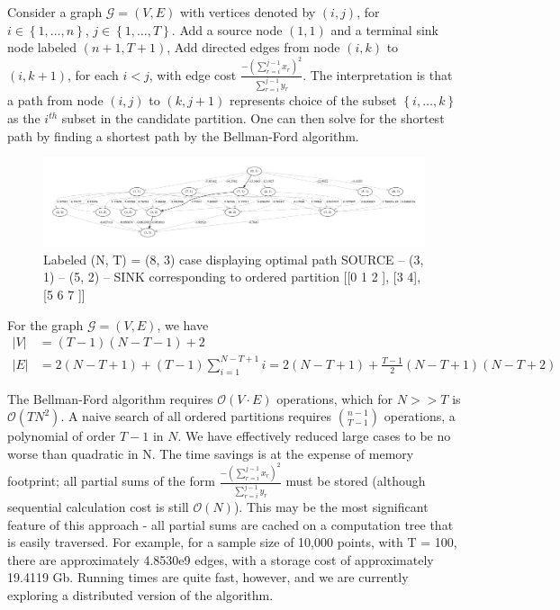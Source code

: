 \documentclass{article}
\theoremstyle{case}
\begin{document}
Consider a graph $\mathcal{G} = \left( V, E\right)$ with vertices denoted by $\left( i, j\right)$, for $i \in \left\lbrace 1, \dots, n\right\rbrace$, $j \in \left\lbrace 1, \dots, T\right\rbrace$. Add a source node $\left( 1, 1\right)$ and a terminal sink node labeled $\left( n+1, T+1\right)$, Add directed edges from node $\left( i,k \right)$ to $\left( i, k+1\right)$, for each $i < j$, with edge cost $\frac{-\left(\sum_{r=i}^{j-1} x_r\right)^2}{\sum_{r=i}^{j-1} y_r}$. The interpretation is that a path from node $\left( i, j\right)$ to $\left( k, j+1\right)$ represents choice of the subset $\left\lbrace i, \dots, k\right\rbrace$ as the $i^{th}$ subset in the candidate partition. One can then solve for the shortest path by finding a shortest path by the Bellman-Ford algorithm. 


% 

\vspace{16pt}
\begin{figure}
  \includegraphics[scale=.25]{8_3_labeled.pdf}
  \caption{Labeled (N, T) = (8, 3) case displaying optimal path SOURCE -- (3, 1) -- (5, 2) --  SINK corresponding to ordered partition [[0 1 2 ], [3 4], [5 6 7 ]]}
\end{figure}

For the graph $\mathcal{G} = \left( V, E\right)$, we have 
\begin{align*}
\vert V \vert & = \left( T-1\right)\left(N-T-1\right) + 2 \\
\vert E \vert & = 2\left( N-T+1\right) + \left( T-1\right)\sum_{i=1}^{N-T+1} i = 2\left( N-T+1\right) + \frac{T-1}{2}\left( N-T+1\right)\left( N-T+2\right)
\end{align*}

The Bellman-Ford algorithm requires $\mathcal{O}\left( V\cdot E\right)$ operations, which for $N >> T$ is $\mathcal{O}\left( TN^2\right)$. A naive search of all ordered partitions requires $\binom{n-1}{T-1}$ operations, a polynomial of order $T-1$ in $N$. We have effectively reduced large cases to be no worse than quadratic in N. The time savings is at the expense of memory footprint; all partial sums of the form $\frac{-\left(\sum_{r=i}^{j-1} x_r\right)^2}{\sum_{r=i}^{j-1} y_r}$ must be stored (although sequential calculation cost is still $\mathcal{O}\left( N\right)$). This may be the most significant feature of this approach - all partial sums are cached on a computation tree that is easily traversed. For example, for a sample size of 10,000 points, with T = 100, there are approximately 4.8530e9 edges, with a storage cost of approximately 19.4119 Gb. Running times are quite fast, however, and we are currently exploring a distributed version of the algorithm.
\end{document}
